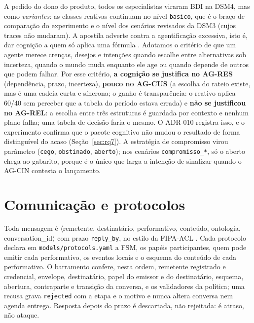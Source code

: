 \documentclass[10pt,a4paper]{article}
\newcommand{\code}[1]{\texttt{#1}}
\begin{document}
A pedido do dono do produto, todos os especialistas viraram BDI na DSM4, mas como \emph{variantes}: as classes
reativas continuam no nível \code{basico}, que é o braço de comparação do experimento e o nível dos cenários revisados
da DSM3 (cujos traces não mudaram). A apostila adverte contra a agentificação excessiva, isto é, dar cognição a quem só
aplica uma fórmula \parencite{cancian2026}. Adotamos o critério de que um agente merece crenças, desejos e intenções
quando escolhe entre alternativas sob incerteza, quando o mundo muda enquanto ele age ou quando depende de outros que
podem falhar. Por esse critério, \textbf{a cognição se justifica no AG-RES} (dependência, prazo, incerteza),
\textbf{pouco no AG-CUS} (a escolha do rateio existe, mas é uma cadeia curta e síncrona; o ganho é transparência: o
reativo aplica 60/40 sem perceber que a tabela do período estava errada) e \textbf{não se justificou no AG-REL}: a
escolha entre três estruturas é guardada por contexto e nenhum plano falha; uma tabela de decisão faria o mesmo. O
ADR-010 registra isso, e o experimento confirma que o pacote cognitivo não mudou o resultado de forma distinguível
do acaso (Seção~\ref{sec:rq7}). A estratégia de compromisso \parencite{rao1991,kinny1991} virou parâmetro
(\code{cego}, \code{obstinado}, \code{aberto}); nos cenários \code{compromisso\_*}, só o aberto chega ao gabarito,
porque é o único que larga a intenção de sinalizar quando o AG-CIN contesta o lançamento.

\section{Comunicação e protocolos}
Toda mensagem é $\langle$remetente, destinatário, performativo, conteúdo, ontologia, conversation\_id$\rangle$ com
prazo \code{reply\_by}, no estilo da FIPA-ACL \parencite{fipa2002acl,fipa2002request}. Cada protocolo declara em
\code{models/protocols.yaml} a FSM, os papéis participantes, quem pode emitir cada performativo, os eventos locais e o
esquema do conteúdo de cada performativo. O barramento confere, nesta ordem, remetente registrado e credencial,
envelope, destinatário, papel do emissor e do destinatário, esquema, abertura, contraparte e transição da conversa, e os
validadores da política; uma recusa grava \code{rejected} com a etapa e o motivo e nunca altera conversa nem agenda
entrega. Resposta depois do prazo é descartada, não rejeitada: é atraso, não ataque.
\end{document}
